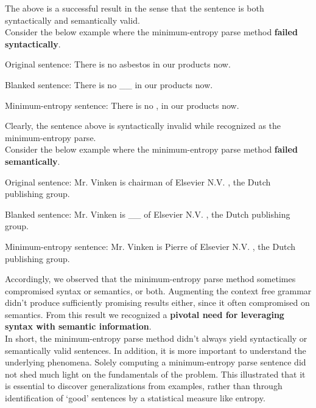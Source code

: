 \documentclass{article}[12pt]
\theoremstyle{definition}
\begin{document}
The above is a successful result in the sense that the sentence is both syntactically and semantically valid.\\

Consider the below example where the minimum-entropy parse method \textbf{failed syntactically}. 

\begin{spverbatim}
	Original sentence: There is no asbestos in our products now.

	Blanked sentence: There is no __ in our products now.

	Minimum-entropy sentence: There is no , in our products now.

\end{spverbatim}

Clearly, the sentence above is syntactically invalid while recognized as the minimum-entropy parse. \\

Consider the below example where the minimum-entropy parse method \textbf{failed semantically}. \\


\begin{spverbatim}
	Original sentence: Mr. Vinken is chairman of Elsevier N.V. , the Dutch publishing group.

	Blanked sentence: Mr. Vinken is __ of Elsevier N.V. , the Dutch publishing group.

	Minimum-entropy sentence: Mr. Vinken is Pierre of Elsevier N.V. , the Dutch publishing group.

\end{spverbatim}

Accordingly, we observed that the minimum-entropy parse method sometimes compromised syntax or semantics, or both. Augmenting the context free grammar didn't produce sufficiently promising results either, since it often compromised on semantics. From this result we recognized a \textbf{pivotal need for leveraging syntax with semantic information}. \\


In short, the minimum-entropy parse method didn't always yield syntactically or semantically valid sentences. In addition, it is more important to understand the underlying phenomena. Solely computing a minimum-entropy parse sentence did not shed much light on the fundamentals of the problem. This illustrated that it is essential to discover generalizations from examples, rather than through identification of `good' sentences by a statistical measure like entropy. \\
\end{document}
